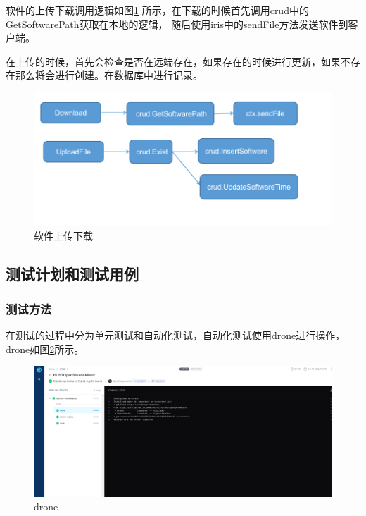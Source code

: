 \documentclass[supercite]{Experimental_Report}
\theoremstyle{definition}
\begin{document}
软件的上传下载调用逻辑如图\ref{updown} 所示，在下载的时候首先调用crud中的GetSoftwarePath获取在本地的逻辑，
随后使用iris中的sendFile方法发送软件到客户端。

在上传的时候，首先会检查是否在远端存在，如果存在的时候进行更新，如果不存在那么将会进行创建。在数据库中进行记录。


\begin{figure}[!h]
    \centering
    \includegraphics[width=1\textwidth]{./images/down.png}
    \caption{软件上传下载}
    \label{updown}
\end{figure}

\subsection{测试计划和测试用例}
\subsubsection{测试方法}
在测试的过程中分为单元测试和自动化测试，自动化测试使用drone进行操作，drone如图\ref{drone}所示。
\begin{figure}[!h]
    \centering
    \includegraphics[width=1\textwidth]{./images/drone.png}
    \caption{drone}
    \label{drone}
\end{figure}
\newpage
\end{document}
